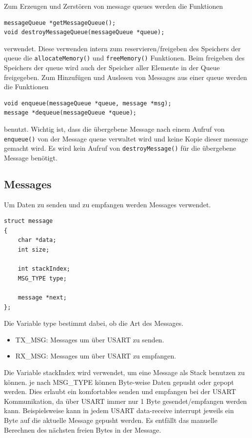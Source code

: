 \documentclass[fontsize=12pt, toc=bibliography, notitlepage]{scrreprt}
\begin{document}
Zum Erzeugen und Zerstören von message queues werden die Funktionen

\begin{lstlisting}
messageQueue *getMessageQueue();
void destroyMessageQueue(messageQueue *queue);
\end{lstlisting}

verwendet. Diese verwenden intern zum reservieren/freigeben des Speichers der queue die  \lstinline$allocateMemory()$ und \lstinline$freeMemory()$ Funktionen. Beim freigeben des Speichers der queue wird auch der Speicher aller Elemente in der Queue freigegeben. Zum Hinzufügen und Auslesen von Messages aus einer queue werden die Funktionen

\begin{lstlisting}
void enqueue(messageQueue *queue, message *msg);
message *dequeue(messageQueue *queue);
\end{lstlisting}

benutzt. Wichtig ist, dass die übergebene Message nach einem Aufruf von \lstinline$enqueue()$ von der Message queue verwaltet wird und keine Kopie dieser message gemacht wird. Es wird kein Aufruf von \lstinline$destroyMessage()$ für die übergebene Message benötigt.

\subsection{Messages}
\label{subsec:shell-messages}
Um Daten zu senden und zu empfangen werden Messages verwendet.

\begin{lstlisting}
struct message
{
	char *data;
	int size;

	int stackIndex;
	MSG_TYPE type;

	message *next;
};
\end{lstlisting}

Die Variable type bestimmt dabei, ob die Art des Messages.
\begin{itemize}
	\item TX\_MSG: Messages um über USART zu senden.
	\item RX\_MSG: Messages um über USART zu empfangen.
\end{itemize}

Die Variable stackIndex wird verwendet, um eine Message als Stack benutzen zu können. je nach MSG\_TYPE können Byte-weise Daten gepusht oder gepopt werden. Dies erlaubt ein komfortables senden und empfangen bei der USART Kommunikation, da über USART immer nur 1 Byte gesendet/empfangen werden kann. Beispielsweise kann in jedem USART data-receive interrupt jeweils ein Byte auf die aktuelle Message gepusht werden. Es entfällt das manuelle Berechnen des nächsten freien Bytes in der Message.
\end{document}
